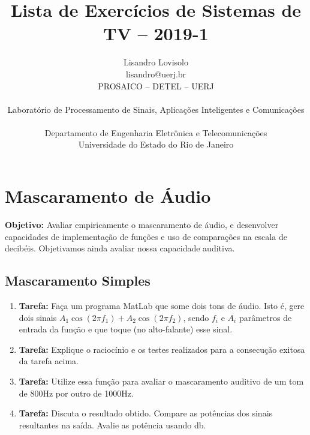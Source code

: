 \documentclass[11pt]{article}
\begin{document}
 

\title{Lista de Exercícios de Sistemas de TV -- 2019-1}
\author{Lisandro Lovisolo \\ lisandro@uerj.br \\ PROSAICO -- DETEL -- UERJ \\ \begin{small} Laboratório de Processamento de Sinais, Aplicações Inteligentes e Comunicações \end{small} \\ Departamento de Engenharia Eletrônica e Telecomunicações \\ Universidade do Estado do Rio de Janeiro}

\maketitle



\section{Mascaramento de Áudio}

\textbf{Objetivo:} Avaliar empiricamente o mascaramento de áudio, e desenvolver capacidades de implementação de funções e uso de comparações na escala de decibéis. Objetivamos ainda avaliar nossa capacidade auditiva. 

\subsection{Mascaramento Simples}

\begin{enumerate}
\item \textbf{Tarefa:} Faça um programa \textsf{MatLab} que some dois tons de áudio. Isto é, gere dois sinais $A_1 \cos(2\pi f_1) + A_2 \cos(2\pi f_2)$, sendo $f_i$ e $A_i$ parâmetros de entrada da função e que toque (no alto-falante) esse sinal.   

\item \textbf{Tarefa:} Explique o raciocínio e os testes realizados para a consecução exitosa da tarefa acima.

\item \textbf{Tarefa:} Utilize essa função para avaliar o mascaramento auditivo de um tom de 800Hz por outro de 1000Hz.

\item \textbf{Tarefa:} Discuta o resultado obtido. Compare as potências dos sinais resultantes na saída. Avalie as potência usando db. 
\end{enumerate}
\end{document}
